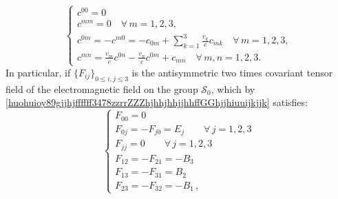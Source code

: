 \documentclass{article}
\theoremstyle{definition}
\theoremstyle{remark}
\newcommand{\er}{\eqref}
\newcommand{\er}{\eqref}
\begin{document}
\begin{equation}\label{khjhhkfgjfjhgghhgjghjhjkkkkgjghghuiiiulkkjlkklKKgfgjhjjghgjhhjhj}
\begin{cases}
c^{00}=0
\\
c^{mm}=0 \quad\forall\, m=1,2,3,
\\
c^{0m}=-c^{m0}=
-c_{0m}+\sum_{k=1}^{3}\frac{v_k}{c}c_{mk} \quad\forall\, m=1,2,3,
\\
c^{mn}=\frac{v_m}{c}c^{0n}-\frac{v_n}{c}c^{0m}
+c_{mn}\quad\forall\, m,n=1,2,3.
\end{cases}
\end{equation}
In particular, if $\{F_{ij}\}_{0\leq i,j\leq 3}$ is the
antisymmetric two times covariant tensor field of the
electromagnetic field on the group $\mathcal{S}_0$, which by
\er{huohuioy89gjjhjffffff3478zzrrZZZhjhhjhhjjhhffGGhjjhiuuijkjjk}
satisfies:
\begin{equation}\label{huohuioy89gjjhjffffff3478zzrrZZZhjhhjhhjjhhffGGhjjhiuuijkjjkihjhjh}
\begin{cases}
F_{00}=0\\ F_{0j}=-F_{j0}=E_j\quad\quad\forall\, j=1,2,3\\
F_{jj}=0\quad\quad\forall\, j=1,2,3
\\
F_{12}=-F_{21}=-B_3
\\
F_{13}=-F_{31}=B_2
\\
F_{23}=-F_{32}=-B_1\,,
\end{cases}
\end{equation}
\end{document}
